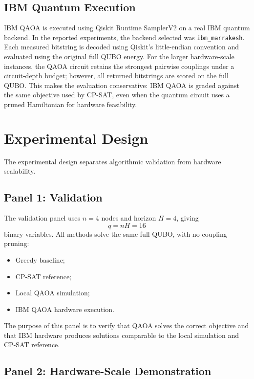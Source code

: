 \documentclass[runningheads]{llncs}
\begin{document}
\subsection{IBM Quantum Execution}

IBM QAOA is executed using Qiskit Runtime SamplerV2 on a real IBM quantum backend. In the reported experiments, the backend selected was \texttt{ibm\_marrakesh}. Each measured bitstring is decoded using Qiskit's little-endian convention and evaluated using the original full QUBO energy. For the larger hardware-scale instances, the QAOA circuit retains the strongest pairwise couplings under a circuit-depth budget; however, all returned bitstrings are scored on the full QUBO. This makes the evaluation conservative: IBM QAOA is graded against the same objective used by CP-SAT, even when the quantum circuit uses a pruned Hamiltonian for hardware feasibility.

\section{Experimental Design}

The experimental design separates algorithmic validation from hardware scalability.

\subsection{Panel 1: Validation}

The validation panel uses $n=4$ nodes and horizon $H=4$, giving
\begin{equation}
q=nH=16
\end{equation}
binary variables. All methods solve the same full QUBO, with no coupling pruning:
\begin{itemize}
    \item Greedy baseline;
    \item CP-SAT reference;
    \item Local QAOA simulation;
    \item IBM QAOA hardware execution.
\end{itemize}
The purpose of this panel is to verify that QAOA solves the correct objective and that IBM hardware produces solutions comparable to the local simulation and CP-SAT reference.

\subsection{Panel 2: Hardware-Scale Demonstration}
\end{document}
